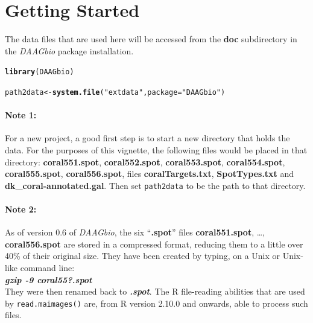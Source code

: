 \documentclass[a4paper,9pt]{article}\usepackage[]{graphicx}\usepackage[]{xcolor}
\makeatletter
\newcommand{\hlstr}[1]{\textcolor[rgb]{0.192,0.494,0.8}{#1}}%
\newcommand{\hlstd}[1]{\textcolor[rgb]{0.345,0.345,0.345}{#1}}%
\newcommand{\hlkwb}[1]{\textcolor[rgb]{0.69,0.353,0.396}{#1}}%
\newcommand{\hlkwc}[1]{\textcolor[rgb]{0.333,0.667,0.333}{#1}}%
\newcommand{\hlkwd}[1]{\textcolor[rgb]{0.737,0.353,0.396}{\textbf{#1}}}%
\newenvironment{kframe}{%
 \def\at@end@of@kframe{}%
 \ifinner\ifhmode%
  \def\at@end@of@kframe{\end{minipage}}%
  \begin{minipage}{\columnwidth}%
 \fi\fi%
 \def\FrameCommand##1{\hskip\@totalleftmargin \hskip-\fboxsep
 \colorbox{shadecolor}{##1}\hskip-\fboxsep
     \hskip-\linewidth \hskip-\@totalleftmargin \hskip\columnwidth}%
 \MakeFramed {\advance\hsize-\width
   \@totalleftmargin\z@ \linewidth\hsize
   \@setminipage}}%
 {\par\unskip\endMakeFramed%
 \at@end@of@kframe}
\newenvironment{knitrout}{}{} %
\makeatother
\begin{document}
\section{Getting Started}

The data files that are used here will be accessed from the {\bf doc}
subdirectory in the {\em DAAGbio} package installation.
\begin{knitrout}
\color{fgcolor}\begin{kframe}
\begin{alltt}
\hlkwd{library}\hlstd{(DAAGbio)}
\end{alltt}


{\ttfamily\noindent\itshape\color{messagecolor}{\#\# Loading required package: limma}}\begin{alltt}
\hlstd{path2data} \hlkwb{<-} \hlkwd{system.file}\hlstd{(}\hlstr{"extdata"}\hlstd{,} \hlkwc{package}\hlstd{=}\hlstr{"DAAGbio"}\hlstd{)}
\end{alltt}
\end{kframe}
\end{knitrout}

\paragraph{Note 1:} For a new project, a good first step is to start a
new directory that holds the data.  For the purposes of this vignette,
the following files would be placed in that directory:
\textbf{coral551.spot}, \textbf{coral552.spot},
\textbf{coral553.spot}, \textbf{coral554.spot},
\textbf{coral555.spot}, \textbf{coral556.spot}, files
\textbf{coralTargets.txt}, \textbf{SpotTypes.txt} and
\textbf{dk\_coral-annotated.gal}. Then set \texttt{path2data} to be
the path to that directory.

\paragraph{Note 2:} As of version 0.6 of \textit{DAAGbio}, the six
``\textbf{.spot}'' files \textbf{coral551.spot}, \ldots,
\textbf{coral556.spot} are stored in a compressed format, reducing
them to a little over 40\% of their original size. They have been
created by typing, on a Unix or Unix-like command line:\\[4pt]
\textbf{\em gzip -9 coral55?.spot}\\[4pt]
They were then renamed back to \textbf{\em *.spot}. The R file-reading
abilities that are used by \texttt{read.maimages()} are, from R
version 2.10.0 and onwards, able to process such files.
\end{document}
